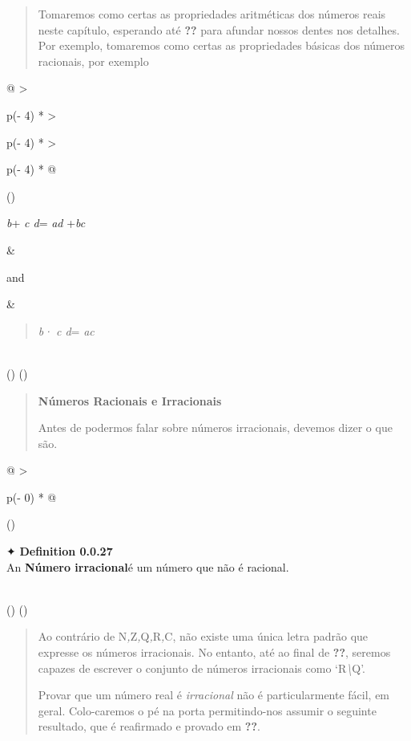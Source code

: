\documentclass[
]{article}
\begin{document}
\begin{quote}
Tomaremos como certas as propriedades aritméticas dos números reais
neste capítulo, esperando até \textbf{??} para afundar nossos dentes nos
detalhes. Por exemplo, tomaremos como certas as propriedades básicas dos
números racionais, por exemplo
\end{quote}

\begin{longtable}[]{@{}
  >{\raggedright\arraybackslash}p{(\columnwidth - 4\tabcolsep) * }
  >{\raggedright\arraybackslash}p{(\columnwidth - 4\tabcolsep) * }
  >{\raggedright\arraybackslash}p{(\columnwidth - 4\tabcolsep) * }@{}}
\toprule()
\begin{minipage}[b]{\linewidth}\raggedright
\emph{b}+ \emph{c d}= \emph{ad} +\emph{bc}
\end{minipage} & \begin{minipage}[b]{\linewidth}\raggedright
and
\end{minipage} & \begin{minipage}[b]{\linewidth}\raggedright
\begin{quote}
\emph{b· c d}= \emph{ac}
\end{quote}
\end{minipage} \\
\midrule()
\endhead
\bottomrule()
\end{longtable}

\begin{quote}
\textbf{Números Racionais e Irracionais}

Antes de podermos falar sobre números irracionais, devemos dizer o que
são.
\end{quote}

\begin{longtable}[]{@{}
  >{\raggedright\arraybackslash}p{(\columnwidth - 0\tabcolsep) * }@{}}
\toprule()
\begin{minipage}[b]{\linewidth}\raggedright
✦ \textbf{Definition 0.0.27}\\
An \textbf{Número irracional}é um número que não é racional.\strut
\end{minipage} \\
\midrule()
\endhead
\bottomrule()
\end{longtable}

\begin{quote}
Ao contrário de N\emph{,}Z\emph{,}Q\emph{,}R\emph{,}C, não existe uma
única letra padrão que expresse os números irracionais. No entanto, até
ao final de \textbf{??}, seremos capazes de escrever o conjunto de
números irracionais como `R\emph{\textbackslash{}}Q'.

Provar que um número real é \emph{irracional} não é particularmente
fácil, em geral. Colo-caremos o pé na porta permitindo-nos assumir o
seguinte resultado, que é reafirmado e provado em \textbf{??}.
\end{quote}
\end{document}
